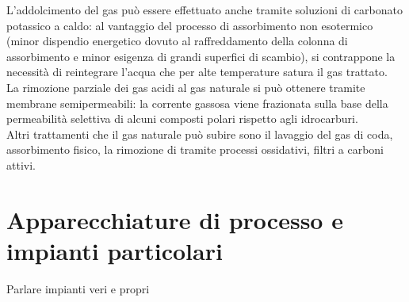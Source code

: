 L'addolcimento del gas può essere effettuato anche tramite soluzioni di carbonato potassico a caldo: al vantaggio del processo di assorbimento non esotermico (minor dispendio energetico dovuto al raffreddamento della colonna di assorbimento e minor esigenza di grandi superfici di scambio), si contrappone la necessità di reintegrare l'acqua che per alte temperature satura il gas trattato.\\
La rimozione parziale dei gas acidi al gas naturale si può ottenere tramite membrane semipermeabili: la corrente gassosa viene frazionata sulla base della permeabilità selettiva di alcuni composti polari rispetto agli idrocarburi.\\
Altri trattamenti che il gas naturale può subire sono il lavaggio del gas di coda, assorbimento fisico, la rimozione di  tramite processi ossidativi, filtri a carboni attivi.

\section{Apparecchiature di processo e impianti particolari}
Parlare impianti veri e propri

